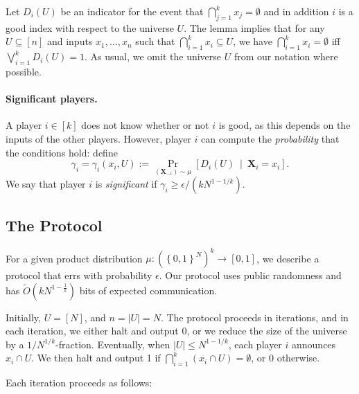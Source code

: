 \documentclass{article}
\newcommand{\set}[1]{\left\{#1\right\}}
\newcommand{\coloneq}{:=}
\newcommand{\eps}{\epsilon}
\newcommand{\given}{\medspace \middle| \medspace}
\newcommand{\rv}[1]{\mathbf{#1}}
\theoremstyle{plain}
\begin{document}
Let $D_i(U)$ be an indicator for the event that $\bigcap_{j = 1}^k x_j = \emptyset$ and in addition $i$ is a good index
with respect to the universe $U$.
The lemma implies that for any $U \subseteq [n]$ and inputs $x_1,\ldots,x_n$ such that $\bigcap_{i = 1}^k x_i \subseteq U$,
we have
$\bigcap_{i = 1}^k x_i = \emptyset$
iff $\bigvee_{i = 1}^k D_i(U) = 1$.
As usual, we omit the universe $U$ from our notation where possible.

\paragraph{Significant players.}
A player $i \in [k]$ does not know whether or not $i$ is good,
as this depends on the inputs of the other players.
However, player $i$ can compute the \emph{probability} that the conditions hold:
define
\begin{equation*}
  \gamma_i = \gamma_i(x_i, U) \coloneq \Pr_{(\rv{X}_{-i}) \sim \mu}\left[ D_i(U) \given \rv{X}_i = x_i \right].
\end{equation*}
We say that player $i$ is \emph{significant} if $\gamma_i \geq \eps / (kN^{1-1/k})$.

\subsection{The Protocol}

For a given product distribution $\mu : \left(\set{0,1}^N\right)^k \rightarrow [0,1]$, we describe a protocol that errs with probability $\epsilon$.
Our protocol uses public randomness and has $\tilde{O}(kN^{1-\frac{1}{k}})$ bits of expected communication.

Initially, $U = [N]$, and $n = |U| = N$.
The protocol proceeds in iterations, and in each iteration, we either halt and output 0,
or we reduce the size of the universe by a $1/N^{1/k}$-fraction.
Eventually, when $|U| \leq N^{1-1/k}$, each player $i$ announces $x_i \cap U$.
We then halt and output 1 if $\bigcap_{i = 1}^k (x_i \cap U) = \emptyset$, or 0 otherwise.

Each iteration proceeds as follows:
\end{document}
